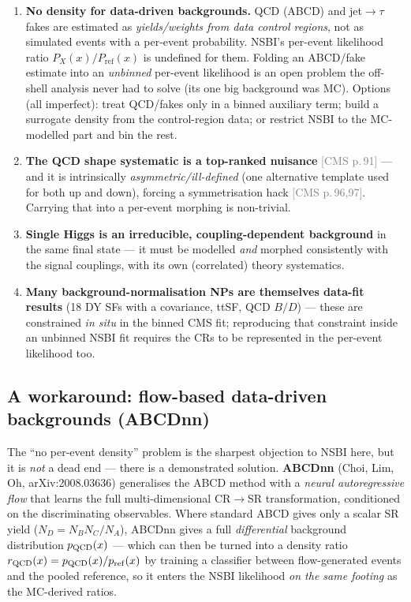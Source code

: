 \documentclass[11pt]{article}
\newcommand{\pC}[1]{\textcolor{gray}{\small[CMS p.\,#1]}}
\begin{document}
\begin{takeaway}
\begin{enumerate}[leftmargin=1.4em]
\item \textbf{No density for data-driven backgrounds.} QCD (ABCD) and jet$\to\tau$ fakes are estimated as
  \emph{yields/weights from data control regions}, not as simulated events with a per-event probability. NSBI's
  per-event likelihood ratio $P_X(x)/P_{\mathrm{ref}}(x)$ is undefined for them. Folding an ABCD/fake estimate into
  an \emph{unbinned} per-event likelihood is an open problem the off-shell analysis never had to solve (its one big
  background was MC). Options (all imperfect): treat QCD/fakes only in a binned auxiliary term; build a surrogate
  density from the control-region data; or restrict NSBI to the MC-modelled part and bin the rest.
\item \textbf{The QCD shape systematic is a top-ranked nuisance} \pC{91} --- and it is intrinsically
  \emph{asymmetric/ill-defined} (one alternative template used for both up and down), forcing a symmetrisation
  hack \pC{96,97}. Carrying that into a per-event morphing is non-trivial.
\item \textbf{Single Higgs is an irreducible, coupling-dependent background} in the same final state --- it must be
  modelled \emph{and} morphed consistently with the signal couplings, with its own (correlated) theory systematics.
\item \textbf{Many background-normalisation NPs are themselves data-fit results} (18 DY SFs with a covariance,
  ttSF, QCD $B/D$) --- these are constrained \emph{in situ} in the binned CMS fit; reproducing that constraint
  inside an unbinned NSBI fit requires the CRs to be represented in the per-event likelihood too.
\end{enumerate}
\end{takeaway}

\subsection*{A workaround: flow-based data-driven backgrounds (ABCDnn)}
The ``no per-event density'' problem is the sharpest objection to NSBI here, but it is \emph{not} a dead end ---
there is a demonstrated solution. \textbf{ABCDnn} (Choi, Lim, Oh, arXiv:2008.03636) generalises the ABCD method
with a \emph{neural autoregressive flow} that learns the full multi-dimensional CR$\to$SR transformation,
conditioned on the discriminating observables. Where standard ABCD gives only a scalar SR yield
($N_D=N_B N_C/N_A$), ABCDnn gives a full \emph{differential} background distribution $p_{\rm QCD}(x)$ --- which can
then be turned into a density ratio $r_{\rm QCD}(x)=p_{\rm QCD}(x)/p_{\rm ref}(x)$ by training a classifier between
flow-generated events and the pooled reference, so it enters the NSBI likelihood \emph{on the same footing} as the
MC-derived ratios.
\end{document}
